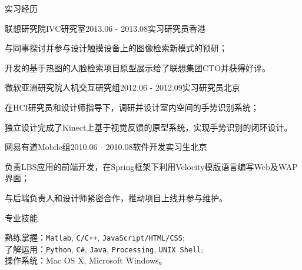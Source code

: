 \documentclass[UTF8]{cv_professional-cn} %
\begin{document}

\begin{rSection}{实习经历}

\begin{rSubsection}{联想研究院IVC研究室}{2013.06 - 2013.08}{实习研究员}{香港}
    \item 与同事探讨并参与设计触摸设备上的图像检索新模式的预研；
    \item 开发的基于热图的人脸检索项目原型展示给了联想集团CTO并获得好评。
\end{rSubsection}

\begin{rSubsection}{微软亚洲研究院人机交互研究组}{2012.06 - 2012.09}{实习研究员}{北京}
    \item 在HCI研究员和设计师指导下，调研并设计室内空间的手势识别系统；
    \item 独立设计完成了Kinect上基于视觉反馈的原型系统，实现手势识别的闭环设计。
\end{rSubsection}

\begin{rSubsection}{网易有道Mobile组}{2010.06 - 2010.08}{软件开发实习生}{北京}
    \item 负责LBS应用的前端开发，在Spring框架下利用Velocity模版语言编写Web及WAP界面；
    \item 与后端负责人和设计师紧密合作，推动项目上线并参与维护。
\end{rSubsection}

\end{rSection}


\begin{rSection}{专业技能}

熟练掌握：\texttt{Matlab}, \texttt{C/C++}, \texttt{JavaScript/HTML/CSS}; \\
了解运用：\texttt{Python}, \texttt{C\#}, \texttt{Java}, \texttt{Processing}, \texttt{UNIX Shell}; \\
操作系统：Mac OS X, Microsoft Windows。

\end{rSection}
\end{document}
